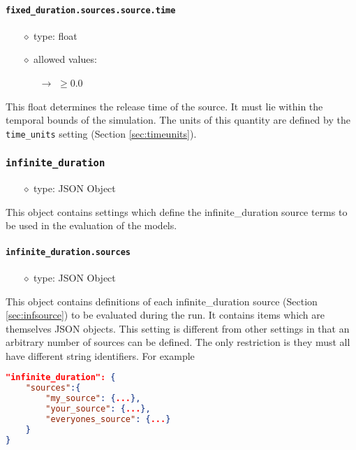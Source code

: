 \documentclass[]{article}
\def\code#1{\texttt{#1}}
\begin{document}
\paragraph{\code{fixed\_duration.sources.source.time}}\label{sec:fixsourcetime}
\begin{itemize}
    \item[$\diamond$] type: float 
    \item[$\diamond$] allowed values:
    \begin{itemize}
        \item[$\rightarrow$] $\geq0.0$
    \end{itemize}
\end{itemize}
This float determines the release time of the source. It must lie within the
temporal bounds of the simulation. The units of this quantity are defined by the
\code{time\_units} setting (Section \ref{sec:timeunits}).

\subsubsection{\code{infinite\_duration}}
\begin{itemize}
    \item[$\diamond$] type: JSON Object 
\end{itemize}
This object contains settings which define the infinite\_duration source terms to be
used in the evaluation of the models.

\paragraph{\code{infinite\_duration.sources}}\label{sec:infsources}
\begin{itemize}
    \item[$\diamond$] type: JSON Object 
\end{itemize}
This object contains definitions of each infinite\_duration source (Section
\ref{sec:infsource}) to be evaluated during the run. It contains items which
are themselves JSON objects. This setting is different from other settings in
that an arbitrary number of sources can be defined. The only restriction is they
must all have different string identifiers. For example\\
\begin{lstlisting}[language=json,firstnumber=1]
"infinite_duration": {
    "sources":{
        "my_source": {...},
        "your_source": {...},
        "everyones_source": {...}
    }
}
\end{lstlisting}
\end{document}
